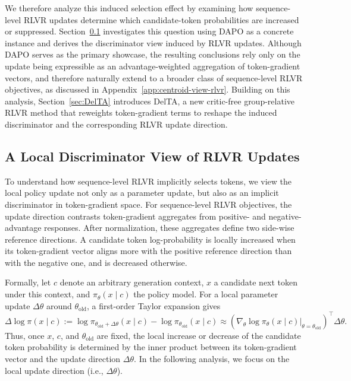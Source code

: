 \documentclass{article} %
\begin{document}
We therefore analyze this induced selection effect by examining how sequence-level RLVR updates determine which candidate-token probabilities are increased or suppressed. Section~\ref{sec:motive} investigates this question using DAPO as a concrete instance and derives the discriminator view induced by RLVR updates. Although DAPO serves as the primary showcase, the resulting conclusions rely only on the update being expressible as an advantage-weighted aggregation of token-gradient vectors, and therefore naturally extend to a broader class of sequence-level RLVR objectives, as discussed in Appendix~\ref{app:centroid-view-rlvr}. Building on this analysis, Section~\ref{sec:DelTA} introduces DelTA, a new critic-free group-relative RLVR method that reweights token-gradient terms to reshape the induced discriminator and the corresponding RLVR update direction.



\subsection{A Local Discriminator View of RLVR Updates}
\label{sec:motive}

To understand how sequence-level RLVR implicitly selects tokens, we view the local policy update not only as a parameter update, but also as an implicit discriminator in token-gradient space.
For sequence-level RLVR objectives, the update direction contrasts token-gradient aggregates from positive- and negative-advantage responses.
After normalization, these aggregates define two side-wise reference directions.
A candidate token log-probability is locally increased when its token-gradient vector aligns more with the positive reference direction than with the negative one, and is decreased otherwise.

Formally, let \(c\) denote an arbitrary generation context, \(x\) a candidate next token under this context, and \(\pi_\theta(x\mid c)\) the policy model. 
For a local parameter update \(\Delta\theta\) around \(\theta_{\mathrm{old}}\), a first-order Taylor expansion gives
\begin{equation}
\label{eq:local-logprob-change}
\Delta \log \pi(x\mid c)
:=
\log \pi_{\theta_{\mathrm{old}}+\Delta\theta}(x\mid c)
-
\log \pi_{\theta_{\mathrm{old}}}(x\mid c)
\approx
\left(
\nabla_\theta \log \pi_\theta(x\mid c)
\Big|_{\theta=\theta_{\mathrm{old}}}
\right)^{\top}
\Delta\theta .
\end{equation}
Thus, once \(x\), \(c\), and \(\theta_{\mathrm{old}}\) are fixed, the local increase or decrease of the candidate token probability is determined by the inner product between its token-gradient vector and the update direction \(\Delta\theta\). In the following analysis, we focus on the local update direction (i.e., \(\Delta\theta\)).
\end{document}
